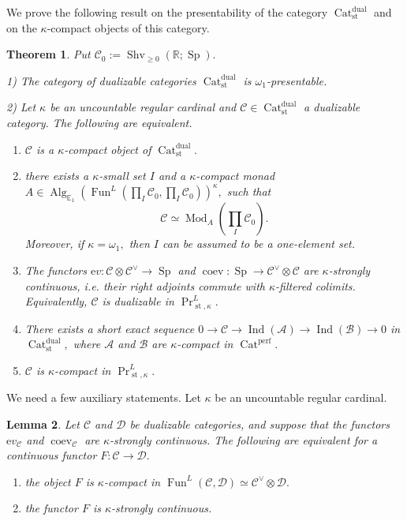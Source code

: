 \documentclass[11pt,leqno]{amsart}
\newtheorem{theo}{Theorem}[section]
\newtheorem{lemma}[theo]{Lemma}
\numberwithin{equation}{section}
\def\R{\mathbb{R}}
\newcommand{\Cat}{\operatorname{Cat}}
\newcommand{\st}{\operatorname{st}}
\newcommand{\dual}{\operatorname{dual}}
\newcommand{\bE}{{\mathbb E}}
\newcommand{\ev}{\mathrm ev}
\newcommand{\cD}{{\mathcal D}}
\newcommand{\cA}{{\mathcal A}}
\newcommand{\cB}{{\mathcal B}}
\newcommand{\cC}{{\mathcal C}}
\newcommand{\Fun}{\operatorname{Fun}}
\newcommand{\perf}{\operatorname{perf}}
\newcommand{\Sh}{\operatorname{Shv}}
\newcommand{\Sp}{\operatorname{Sp}}
\newcommand{\Ind}{\operatorname{Ind}}
\newcommand{\Alg}{\operatorname{Alg}}
\newcommand{\coev}{\operatorname{coev}}
\newcommand{\Mod}{\operatorname{Mod}}
\begin{document}
We prove the following result on the presentability of the category $\Cat_{\st}^{\dual}$ and on the $\kappa$-compact objects of this category.

\begin{theo}\label{th:presentability_of_Cat^dual}Put $\cC_0:=\Sh_{\geq 0}(\R;\Sp).$ 

1) The category of dualizable categories $\Cat_{\st}^{\dual}$ is $\omega_1$-presentable. 

2) Let $\kappa$ be an uncountable regular cardinal and $\cC\in\Cat_{\st}^{\dual}$ a dualizable category. The following are equivalent.

\begin{enumerate}[label=(\roman*),ref=(\roman*)]
\item $\cC$ is a $\kappa$-compact object of $\Cat_{\st}^{\dual}.$ \label{presentability1}

\item there exists a $\kappa$-small set $I$ and a $\kappa$-compact monad $A\in\Alg_{\bE_1}(\Fun^{L}(\prod\limits_I\cC_0,\prod\limits_I\cC_0))^{\kappa},$ such that $$\cC\simeq\Mod_A(\prod\limits_I\cC_0).$$
Moreover, if $\kappa=\omega_1,$ then $I$ can be assumed to be a one-element set. \label{presentability2}
 
\item The functors $\ev:\cC\otimes\cC^{\vee}\to\Sp$ and $\coev:\Sp\to\cC^{\vee}\otimes\cC$ are $\kappa$-strongly continuous, i.e. their right adjoints commute with $\kappa$-filtered colimits. Equivalently, $\cC$ is dualizable in $\Pr^L_{\st,\kappa}.$ \label{presentability3}

\item There exists a short exact sequence $0\to\cC\to\Ind(\cA)\to\Ind(\cB)\to 0$ in $\Cat_{\st}^{\dual},$ where $\cA$ and $\cB$ are $\kappa$-compact in $\Cat^{\perf}.$ \label{presentability4}

\item $\cC$ is $\kappa$-compact in $\Pr^L_{\st,\kappa}.$ \label{presentability5}
\end{enumerate}
\end{theo}



We need a few auxiliary statements. Let $\kappa$ be an uncountable regular cardinal.

\begin{lemma}\label{lem:kappa_compactness_and_pseudocompactness} Let $\cC$ and $\cD$ be dualizable categories, and suppose that the functors $\ev_{\cC}$ and $\coev_{\cC}$ are $\kappa$-strongly continuous. The following are equivalent for a continuous functor $F:\cC\to\cD.$

\begin{enumerate}[label=(\roman*),ref=(\roman*)]
\item the object $F$ is $\kappa$-compact in $\Fun^{L}(\cC,\cD)\simeq\cC^{\vee}\otimes\cD.$ \label{kappa_strcont1}

\item the functor $F$ is $\kappa$-strongly continuous. \label{kappa_strcont2}
\end{enumerate}
\end{lemma}
\end{document}
